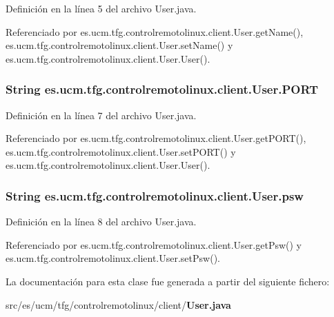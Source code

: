 Definición en la línea 5 del archivo User.\-java.



Referenciado por es.\-ucm.\-tfg.\-controlremotolinux.\-client.\-User.\-get\-Name(), es.\-ucm.\-tfg.\-controlremotolinux.\-client.\-User.\-set\-Name() y es.\-ucm.\-tfg.\-controlremotolinux.\-client.\-User.\-User().

\subsubsection[{P\-O\-R\-T}]{\setlength{\rightskip}{0pt plus 5cm}String es.\-ucm.\-tfg.\-controlremotolinux.\-client.\-User.\-P\-O\-R\-T\hspace{0.3cm}{\ttfamily [private]}}\label{classes_1_1ucm_1_1tfg_1_1controlremotolinux_1_1client_1_1User_ac02fa35b60f0041b06c8b9a136e06658}


Definición en la línea 7 del archivo User.\-java.



Referenciado por es.\-ucm.\-tfg.\-controlremotolinux.\-client.\-User.\-get\-P\-O\-R\-T(), es.\-ucm.\-tfg.\-controlremotolinux.\-client.\-User.\-set\-P\-O\-R\-T() y es.\-ucm.\-tfg.\-controlremotolinux.\-client.\-User.\-User().

\subsubsection[{psw}]{\setlength{\rightskip}{0pt plus 5cm}String es.\-ucm.\-tfg.\-controlremotolinux.\-client.\-User.\-psw\hspace{0.3cm}{\ttfamily [private]}}\label{classes_1_1ucm_1_1tfg_1_1controlremotolinux_1_1client_1_1User_a788ba85fa6b830d20116cebf8c479a28}


Definición en la línea 8 del archivo User.\-java.



Referenciado por es.\-ucm.\-tfg.\-controlremotolinux.\-client.\-User.\-get\-Psw() y es.\-ucm.\-tfg.\-controlremotolinux.\-client.\-User.\-set\-Psw().



La documentación para esta clase fue generada a partir del siguiente fichero\-:\begin{DoxyCompactItemize}
\item 
src/es/ucm/tfg/controlremotolinux/client/{\bf User.\-java}\end{DoxyCompactItemize}
